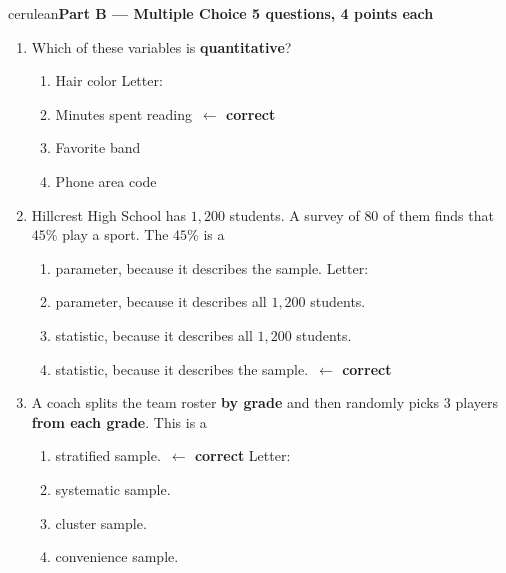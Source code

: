 \documentclass[10pt]{article}
\makeatletter
\newcommand{\parthead}[1]{%
  \vspace{6pt}\noindent
  {\tcbset{after={\par\nopagebreak}}%
   \begin{headlinebox}{cerulean}{\color{white}\bfseries #1}\end{headlinebox}}%
  \nopagebreak\vspace{4pt}}
\newcommand{\correct}{\ifsaar@workvisible\ \textcolor{keyred}{\textbf{$\leftarrow$ correct}}\fi}
\makeatother
\begin{document}
\boxguard[8]
\parthead{Part B --- Multiple Choice \hfill 5 questions, 4 points each}

\small
\begin{enumerate}[leftmargin=2.2em, itemsep=5pt, topsep=2pt, start=11]

\item Which of these variables is \textbf{quantitative}?
\begin{enumerate}[label=(\Alph*), leftmargin=1.8em, itemsep=1pt, topsep=1pt]
  \item Hair color
\hfill Letter:~\gradedblank[id=q11, type=choice, points=4, answer={B}]{0.45in}{10pt}  \item Minutes spent reading\correct
  \item Favorite band
  \item Phone area code
\end{enumerate}

\boxguard[7]
\item Hillcrest High School has $1{,}200$ students. A survey of $80$ of them finds
that $45\%$ play a sport. The $45\%$ is a
\begin{enumerate}[label=(\Alph*), leftmargin=1.8em, itemsep=1pt, topsep=1pt]
  \item parameter, because it describes the sample.
\hfill Letter:~\gradedblank[id=q12, type=choice, points=4, answer={D}]{0.45in}{10pt}  \item parameter, because it describes all $1{,}200$ students.
  \item statistic, because it describes all $1{,}200$ students.
  \item statistic, because it describes the sample.\correct
\end{enumerate}

\boxguard[7]
\item A coach splits the team roster \textbf{by grade} and then randomly picks $3$
players \textbf{from each grade}. This is a
\begin{enumerate}[label=(\Alph*), leftmargin=1.8em, itemsep=1pt, topsep=1pt]
  \item stratified sample.\correct
\hfill Letter:~\gradedblank[id=q13, type=choice, points=4, answer={A}]{0.45in}{10pt}  \item systematic sample.
  \item cluster sample.
  \item convenience sample.
\end{enumerate}


\end{enumerate}
\end{document}
